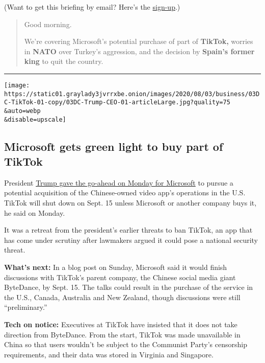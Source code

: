 (Want to get this briefing by email? Here's the
\href{https://www.nytimes3xbfgragh.onion/morning-briefing}{sign-up}.)

\begin{quote}
Good morning.

We're covering Microsoft's potential purchase of part of
\textbf{TikTok,} worries in \textbf{NATO} over Turkey's aggression, and
the decision by \textbf{Spain's former king} to quit the country.
\end{quote}

\begin{center}\rule{0.5\linewidth}{\linethickness}\end{center}

\texttt{[image: https://static01.graylady3jvrrxbe.onion/images/2020/08/03/business/03DC-TikTok-01-copy/03DC-Trump-CEO-01-articleLarge.jpg?quality=75\\\&auto=webp\\\&disable=upscale]}

\hypertarget{microsoft-gets-green-light-to-buy-part-of-tiktok}{%
\subsection{Microsoft gets green light to buy part of
TikTok}\label{microsoft-gets-green-light-to-buy-part-of-tiktok}}

President
\href{https://www.nytimes3xbfgragh.onion/2020/08/03/technology/trump-tiktok-microsoft.html?action=click\&module=Top\%20Stories\&pgtype=Homepage}{Trump
gave the go-ahead on Monday for Microsoft} to pursue a potential
acquisition of the Chinese-owned video app's operations in the U.S.
TikTok will shut down on Sept. 15 unless Microsoft or another company
buys it, he said on Monday.

It was a retreat from the president's earlier threats to ban TikTok, an
app that has come under scrutiny after lawmakers argued it could pose a
national security threat.

\textbf{What's next:} In a blog post on Sunday, Microsoft said it would
finish discussions with TikTok's parent company, the Chinese social
media giant ByteDance, by Sept. 15. The talks could result in the
purchase of the service in the U.S., Canada, Australia and New Zealand,
though discussions were still ``preliminary.''

\textbf{Tech on notice:} Executives at TikTok have insisted that it does
not take direction from ByteDance. From the start, TikTok was made
unavailable in China so that users wouldn't be subject to the Communist
Party's censorship requirements, and their data was stored in Virginia
and Singapore.

